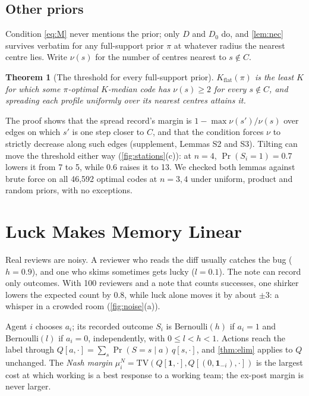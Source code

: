 \documentclass[sigconf,anonymous,acmthm=false]{acmart}
\theoremstyle{acmplain}
\newtheorem{theorem}{Theorem}
\theoremstyle{acmdefinition}
\newcommand{\TV}{\mathrm{TV}}
\newcommand{\Kflat}{K_{\mathrm{flat}}}
\begin{document}
\subsection{Other priors}\label{sec:prior}
Condition \eqref{eq:M} never mentions the prior; only $D$ and $D_0$ do, and
\cref{lem:nec} survives verbatim for any full-support prior $\pi$ at whatever radius the
nearest centre lies. Write $\nu(s)$ for the number of centres nearest to $s\notin C$.

\begin{theorem}[The threshold for every full-support prior]\label{thm:prior}
$\Kflat(\pi)$ is the least $K$ for which some $\pi$-optimal $K$-median code has
$\nu(s)\ge2$ for every $s\notin C$, and spreading each profile uniformly over its nearest
centres attains it.
\end{theorem}

The proof shows that the spread record's margin is $1-\max\nu(s')/\nu(s)$ over edges on
which $s'$ is one step closer to $C$, and that the condition forces $\nu$ to strictly
decrease along such edges (supplement, Lemmas S2 and S3). Tilting can move the threshold
either way (\cref{fig:stations}(c)): at $n=4$, $\Pr(S_i{=}1)=0.7$ lowers it from 7 to 5,
while $0.6$ raises it to 13. We checked both lemmas against brute force on all 46,592
optimal codes at $n=3,4$ under uniform, product and random priors, with no exceptions.

\section{Luck Makes Memory Linear}\label{sec:noisy}

\begin{story}
Real reviews are noisy. A reviewer who reads the diff usually catches the bug ($h=0.9$),
and one who skims sometimes gets lucky ($l=0.1$). The note can record only outcomes. With
100 reviewers and a note that counts successes, one shirker lowers the expected count by
0.8, while luck alone moves it by about $\pm3$: a whisper in a crowded room
(\cref{fig:noise}(a)).
\end{story}

Agent $i$ chooses $a_i$; its recorded outcome $S_i$ is Bernoulli$(h)$ if $a_i=1$ and
Bernoulli$(l)$ if $a_i=0$, independently, with $0\le l<h<1$. Actions reach the label
through $Q[a,\cdot]=\sum_s\Pr(S=s\mid a)\,q[s,\cdot]$, and \cref{thm:elim} applies to $Q$
unchanged. The \emph{Nash margin}
$\mu_i^N=\TV(Q[\mathbf1,\cdot],Q[(0,\mathbf1_{-i}),\cdot])$ is the largest cost at which
working is a best response to a working team; the ex-post margin is never larger.
\end{document}
